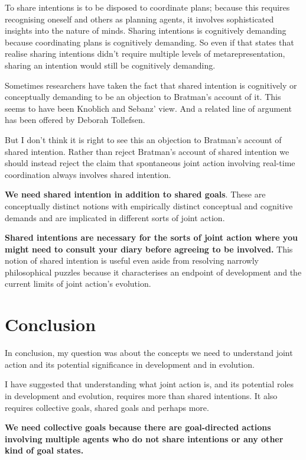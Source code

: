 \documentclass[14pt,a4paper]{extarticle}
\begin{document}
To share intentions is to be disposed to coordinate plans; because this requires recognising oneself and others as planning agents, it involves sophisticated insights into the nature of minds.  
Sharing intentions is cognitively demanding because coordinating plans is cognitively demanding.
So even if that states that realise sharing intentions didn’t require multiple levels of metarepresentation, sharing an intention would still be cognitively demanding.

Sometimes researchers have taken the fact that shared intention is cognitively or conceptually demanding to be an objection to Bratman's account of it.
This seems to have been Knoblich and Sebanz' view.
And a related line of argument has been offered by Deborah Tollefsen.

But I don't think it is right to see this an objection to Bratman's account of shared intention.
Rather than reject Bratman's account of shared intention we should instead reject  the claim that spontaneous joint action involving real-time coordination always involves shared intention.

\textbf{We need shared intention in addition to shared goals}.  These are conceptually distinct notions with empirically distinct conceptual and cognitive demands and are implicated in different sorts of joint action.

\textbf{Shared intentions are necessary for the sorts of joint action where you might need to consult your diary before agreeing to be involved.}  This notion of shared intention is useful even aside from resolving narrowly philosophical puzzles because it characterises an endpoint of development and the current limits of joint action's evolution.


\section{Conclusion}

In conclusion, my question was about the concepts we need to understand joint action and its potential significance in development and in evolution.

I have suggested that understanding what joint action is, and its potential roles in development and evolution, requires more than shared intentions.  It also requires collective goals, shared goals and perhaps more.

\textbf{We need collective goals because there are goal-directed actions involving multiple agents who do not share intentions or any other kind of goal states.}
\end{document}

